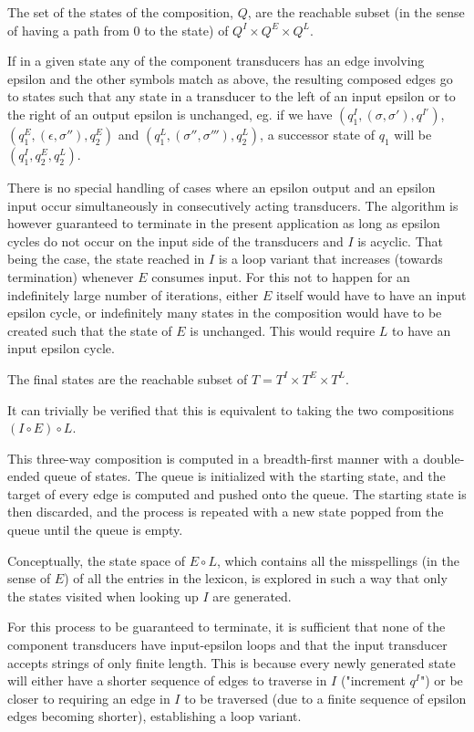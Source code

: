 \documentclass[draft]{llncs}
\begin{document}
The set of the states of the composition, $Q$, are the reachable subset
(in the sense of having a path from $0$ to the state) of
$Q^I \times Q^E \times Q^L$.

If in a given state any of the component transducers has an edge involving
epsilon and the other symbols match as above, the resulting composed edges
go to states such that any state in a transducer to the left of an input
epsilon or to the right of an output epsilon is unchanged, eg. if we have
$(q^I_1, (\sigma, \sigma'), q^{I'})$, $(q^E_1, (\epsilon, \sigma''), q^E_2)$ and
$(q^L_1, (\sigma'', \sigma'''), q^L_2)$, a successor state of $q_1$ will be
$(q^I_1, q^E_2, q^L_2)$.

There is no special handling of cases where an epsilon output and an epsilon
input occur simultaneously in consecutively acting transducers. The algorithm
is however guaranteed to terminate in the present application as long as
epsilon cycles do not occur on the input side of the transducers and $I$
is acyclic. That being the case, the state reached in $I$ is a loop variant
that increases (towards termination) whenever $E$ consumes input. For this
not to happen for an indefinitely large number of iterations, either $E$
itself would have to have an input epsilon cycle, or indefinitely many states
in the composition would have to be created such that the state of $E$ is
unchanged. This would require $L$ to have an input epsilon cycle.

The final states are the reachable subset of $T = T^I \times T^E \times T^L$.

It can trivially be verified that this is equivalent to taking the two
compositions $(I \circ E) \circ L$.

This three-way composition is computed in a breadth-first manner with a
double-ended queue of states. The queue is initialized with the starting state,
and the target of every edge is computed and pushed onto the
queue. The starting state is then discarded, and the process is repeated
with a new state popped from the queue until the queue is empty.

Conceptually, the state space of $E \circ L$, which contains all the
misspellings (in the sense of $E$) of all the entries in the lexicon, is
explored in such a way that only the states visited when looking up $I$ are
generated.

For this process to be guaranteed to terminate, it is sufficient that none of
the component transducers have input-epsilon loops and that the input
transducer accepts strings of only finite length. This is because every newly
generated state will either have a shorter sequence of edges to traverse in
$I$ ("increment $q^I$") or be closer to requiring an edge in $I$ to be traversed
(due to a finite sequence of epsilon edges becoming shorter), establishing a
loop variant.
\end{document}

